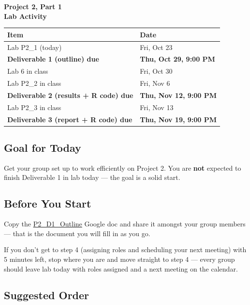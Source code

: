 \documentclass[12pt]{article}
\begin{document}
\begin{center}
\textbf{\Large Project 2, Part 1 \\ Lab Activity}
\end{center}

\begin{center}
\begin{tabular}{ll}
\toprule
\textbf{Item} & \textbf{Date} \\
\midrule
Lab P2\_1 (today) & Fri, Oct 23 \\
\textbf{Deliverable 1 (outline) due} & \textbf{Thu, Oct 29, 9:00 PM} \\
Lab 6 in class & Fri, Oct 30 \\
Lab P2\_2 in class & Fri, Nov 6 \\
\textbf{Deliverable 2 (results + R code) due} & \textbf{Thu, Nov 12, 9:00 PM} \\
Lab P2\_3 in class & Fri, Nov 13 \\
\textbf{Deliverable 3 (report + R code) due} & \textbf{Thu, Nov 19, 9:00 PM} \\
\bottomrule
\end{tabular}
\end{center}

\subsection*{Goal for Today}
Get your group set up to work efficiently on Project 2. You are \textbf{not} expected to finish Deliverable 1 in lab today --- the goal is a solid start.

\subsection*{Before You Start}
Copy the \href{https://docs.google.com/document/d/1J5nZ17STPfx3xI3VadGgF2XQOvTIQxo3MpW34h-n1bU/edit?usp=sharing}{P2\_D1\_Outline} Google doc and share it amongst your group members --- that is the document you will fill in as you go.

If you don't get to step 4 (assigning roles and scheduling your next meeting) with 5 minutes left, stop where you are and move straight to step 4 --- every group should leave lab today with roles assigned and a next meeting on the calendar.

\subsection*{Suggested Order}
\end{document}
